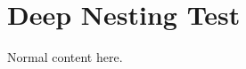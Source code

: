 \documentclass{article}
\begin{document}
\newcommand{\deepnest}[1]{{\deepnest{#1}}}
\section{Deep Nesting Test}
Normal content here.
\end{document}

